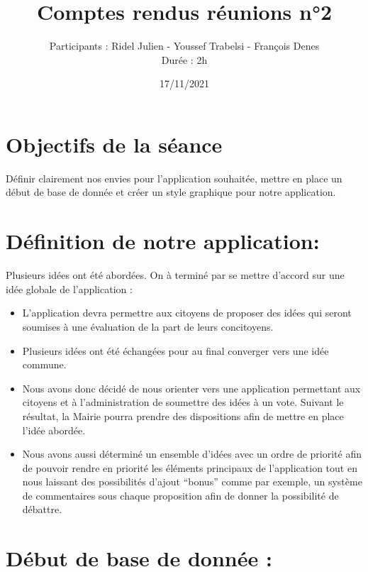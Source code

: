 \documentclass{article}
\title{\Huge Comptes rendus réunions n°2}
\author{Participants : Ridel Julien - Youssef Trabelsi - François Denes \\ Durée : 2h}
\date{17/11/2021}
\begin{document}
\maketitle

\section{\huge Objectifs de la séance}

\Large Définir clairement nos envies pour l’application souhaitée, mettre en place un début de base de donnée et créer un style graphique pour notre application.

\section{\huge Définition de notre application: } 
\Large Plusieurs idées ont été abordées. On à terminé par se mettre d’accord sur une idée globale de l’application : \\

\begin{itemize}

    \item \Large L’application devra permettre aux citoyens de proposer des idées qui seront soumises à une évaluation de la part de leurs concitoyens.
    
    \item \Large Plusieurs idées ont été échangées pour au final converger vers une idée commune.
    
    \item \Large Nous avons donc décidé de nous orienter vers une application permettant aux citoyens et à l’administration de soumettre des idées à un vote. Suivant le résultat, la Mairie pourra prendre des dispositions afin de mettre en place l’idée abordée.

    \item Nous avons aussi déterminé un ensemble d’idées avec un ordre de priorité afin de pouvoir rendre en priorité les éléments principaux de l’application tout en nous laissant des possibilités d’ajout “bonus” comme par exemple, un système de commentaires sous chaque proposition afin de donner la possibilité de débattre.
\end{itemize}

\section{\huge Début de base de donnée :}
\end{document}
